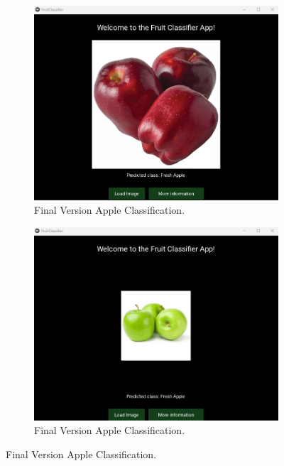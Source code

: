 \documentclass[conference]{IEEEtran}
\begin{document}
\begin{figure}[h]
    \centering
    \begin{subfigure}[b]{0.48\linewidth}
        \centering
        \includegraphics[width=\linewidth]{Mlayer appel1.png}
        \caption{Final Version Apple Classification.}
        \label{figFA}
    \end{subfigure}
    \hfill
    \begin{subfigure}[b]{0.48\linewidth}
        \centering
        \includegraphics[width=\linewidth]{Mlayer appel2.png}
        \caption{Final Version Apple Classification.}
        \label{figFB}
    \end{subfigure}

\end{figure}
\end{document}
